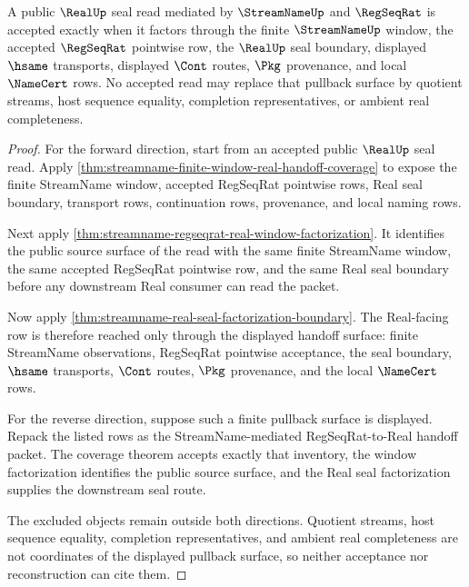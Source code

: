 \begin{theorem}
\label{thm:streamname-real-handoff-pullback-exactness}
A public $\RealUp$ seal read mediated by $\StreamNameUp$ and $\RegSeqRat$ is accepted exactly when it factors through the finite $\StreamNameUp$ window, the accepted $\RegSeqRat$ pointwise row, the $\RealUp$ seal boundary, displayed $\hsame$ transports, displayed $\Cont$ routes, $\Pkg$ provenance, and local $\NameCert$ rows. No accepted read may replace that pullback surface by quotient streams, host sequence equality, completion representatives, or ambient real completeness.
\end{theorem}
\begin{proof}
For the forward direction, start from an accepted public $\RealUp$ seal read. Apply \autoref{thm:streamname-finite-window-real-handoff-coverage} to expose the finite StreamName window, accepted RegSeqRat pointwise rows, Real seal boundary, transport rows, continuation rows, provenance, and local naming rows.

Next apply \autoref{thm:streamname-regseqrat-real-window-factorization}. It identifies the public source surface of the read with the same finite StreamName window, the same accepted RegSeqRat pointwise row, and the same Real seal boundary before any downstream Real consumer can read the packet.

Now apply \autoref{thm:streamname-real-seal-factorization-boundary}. The Real-facing row is therefore reached only through the displayed handoff surface: finite StreamName observations, RegSeqRat pointwise acceptance, the seal boundary, $\hsame$ transports, $\Cont$ routes, $\Pkg$ provenance, and the local $\NameCert$ rows.

For the reverse direction, suppose such a finite pullback surface is displayed. Repack the listed rows as the StreamName-mediated RegSeqRat-to-Real handoff packet. The coverage theorem accepts exactly that inventory, the window factorization identifies the public source surface, and the Real seal factorization supplies the downstream seal route.

The excluded objects remain outside both directions. Quotient streams, host sequence equality, completion representatives, and ambient real completeness are not coordinates of the displayed pullback surface, so neither acceptance nor reconstruction can cite them.
\end{proof}

